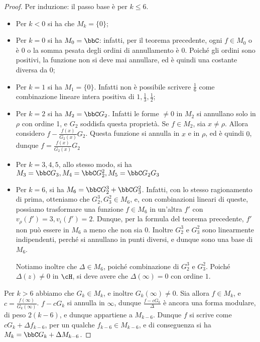 \begin{proof}
	Per induzione: il passo base è per $k\leq6$.
	\begin{itemize}
		\item Per $k<0$ si ha che $M_k=\{0\}$;

		\item Per $k=0$ si ha $M_0=\bbC$: infatti, per il teorema precedente, ogni $f\in M_0$ o è $0$ o la somma pesata degli ordini di annullamento è $0$. Poiché gli ordini sono positivi, la funzione non si deve mai annullare, ed è quindi una costante diversa da $0$;

		\item Per $k=1$ si ha $M_1=\{0\}$. Infatti non è possibile scrivere $\frac{1}{6}$ come combinazione lineare intera positiva di $1, \frac{1}{3}, \frac{1}{2}$;

		\item Per $k=2$ si ha $M_2=\bbC G_2$. Infatti le forme $\neq0$ in $M_2$ si annullano solo in $\rho$ con ordine 1,
		e $G_2$ soddisfa questa proprietà. Se $f\in M_2$, sia $x\neq\rho$. Allora considero $f-\frac{f(x)}{G_2(x)}G_2$. Questa funzione si annulla in $x$ e in $\rho$, ed è quindi $0$, dunque $f=\frac{f(x)}{G_2(x)}G_2$

		\item Per $k=3, 4, 5$, allo stesso modo, si ha $M_3=\bbC G_3, M_4=\bbC G_2^2, M_5= \bbC G_2G_3$

		\item Per $k=6$, si ha $M_6=\bbC G_2^3 + \bbC G_3^2$. Infatti, con lo stesso ragionamento di prima, otteniamo che $G_2^3, G_3^2 \in M_6$, e, con combinazioni lineari di queste, possiamo trasformare una funzione $f \in M_6$ in un'altra $f'$ con $v_\rho(f')=3, v_i(f')=2$.
		Dunque, per la formula del teorema precedente, $f'$ non può essere in $M_6$ a meno che non sia $0$.
		Inoltre $G_2^3$ e $G_3^2$ sono linearmente indipendenti, perché si annullano in punti diversi, e dunque sono una base di $M_6$.

		Notiamo inoltre che $\Delta\in M_6$, poiché combinazione di $G_2^3$ e $G_3^2$.
		Poiché $\Delta(z)\neq0$ in $\cH$, si deve avere che $\Delta(\infty)=0$ con ordine $1$.
	\end{itemize}

	Per $k>6$ abbiamo che $G_k \in M_k$, e inoltre $G_k(\infty)\neq0$.
	Sia allora $f \in M_k$, e $c=\frac{f(\infty)}{G_k(\infty)}$. $f-cG_k$ si annulla in $\infty$, dunque $\frac{f-cG_k}{\Delta}$ è ancora una forma modulare, di peso $2(k-6)$, e dunque appartiene a $M_{k-6}$.
	Dunque $f$ si scrive come $cG_k+\Delta f_{k-6}$, per un qualche $f_{k-6} \in M_{k-6}$, e di conseguenza si ha $M_k=\bbC G_k + \Delta M_{k-6}$.


\end{proof}
